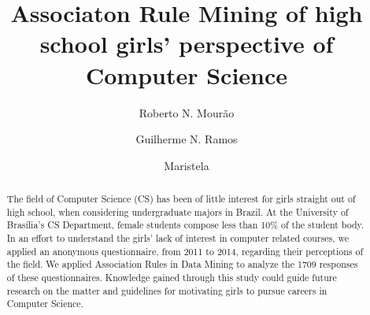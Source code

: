 \documentclass{llncs}
\begin{document}
%
\title{Associaton Rule Mining of high school girls' perspective of Computer Science}%
%
\author{Roberto N. Mourão%
\and Guilherme N. Ramos%
\and Maristela}%
%
%

\maketitle%

\begin{abstract}%
The field of Computer Science (CS) has been of little interest for girls straight out of high school, when considering undergraduate majors in Brazil. At the University of Brasília’s CS Department, female students compose less than 10\% of the student body. In an effort to understand the girls’ lack of interest in computer related courses, we applied an anonymous questionnaire, from 2011 to 2014, regarding their perceptions of the field. We applied Association Rules in Data Mining to analyze the 1709 responses of these questionnaires. Knowledge gained through this study could guide future research on the matter and guidelines for motivating girls to pursue careers in Computer Science.


%
\end{abstract}%

%
%
%
%
%

%
%
\end{document}
